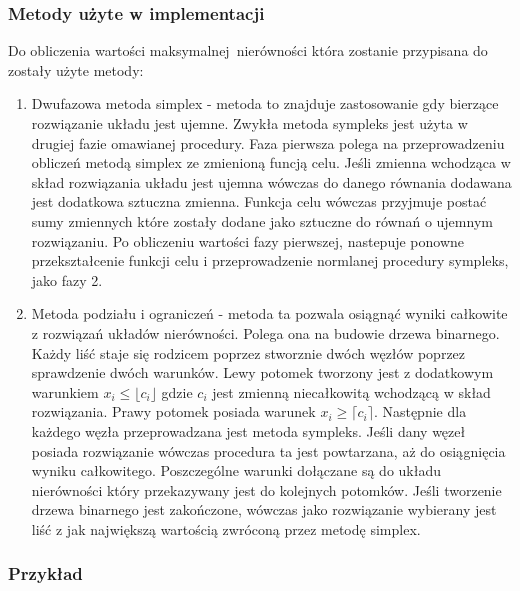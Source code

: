 \subsubsection{Metody użyte w implementacji}

Do obliczenia wartości maksymalnej nierówności która zostanie przypisana do  zostały użyte metody:
\begin{enumerate}
  \item Dwufazowa metoda simplex - metoda to znajduje zastosowanie gdy bierzące rozwiązanie układu jest ujemne. Zwykła metoda sympleks jest użyta w drugiej fazie omawianej procedury. Faza pierwsza polega na przeprowadzeniu obliczeń metodą simplex ze zmienioną funcją celu. Jeśli zmienna wchodząca w skład rozwiązania układu jest ujemna wówczas do danego równania dodawana jest dodatkowa sztuczna zmienna. Funkcja celu wówczas przyjmuje postać sumy zmiennych które zostały dodane jako sztuczne do równań o ujemnym rozwiązaniu. Po obliczeniu wartości fazy pierwszej, nastepuje ponowne przekształcenie funkcji celu i przeprowadzenie normlanej procedury sympleks, jako fazy 2.
  \item Metoda podziału i ograniczeń - metoda ta pozwala osiągnąć wyniki całkowite z rozwiązań układów nierówności. Polega ona na budowie drzewa binarnego. Każdy liść staje się rodzicem poprzez stworznie dwóch węzłów poprzez sprawdzenie dwóch warunków. Lewy potomek tworzony jest z dodatkowym warunkiem $x_i \le \lfloor c_i \rfloor$ gdzie $c_i$ jest zmienną niecałkowitą wchodzącą w skład rozwiązania. Prawy potomek posiada warunek $x_i \ge \lceil c_i \rceil$. Następnie dla każdego węzła przeprowadzana jest metoda sympleks. Jeśli dany węzeł posiada rozwiązanie wówczas procedura ta jest powtarzana, aż do osiągnięcia wyniku całkowitego. Poszczególne warunki dołączane są do układu nierówności który przekazywany jest do kolejnych potomków. Jeśli tworzenie drzewa binarnego jest zakończone, wówczas jako rozwiązanie wybierany jest liść z jak największą wartością zwróconą przez metodę simplex.
\end{enumerate}

\subsubsection{Przykład}

